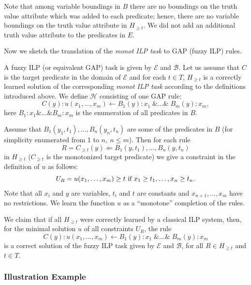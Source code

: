 Note that among variable boundings in $B$ there are no boundings on the truth value attribute which was added to each predicate; hence, there are no variable boundings on the truth value attribute in $H_{\ge t}$. We did not add an additional truth value attribute to the predicates in $E$. 

Now we sketch the translation of the \emph{monot ILP task} to GAP (fuzzy ILP) rules. 

\begin{theorem}
A fuzzy ILP (or equivalent GAP) task is given by ${\mathcal E}$ and ${\mathcal B}$. Let us assume that $C$ is the target predicate in the domain of ${\mathcal E}$ and for each $t \in T$, $H_{\ge t}$ is a correctly learned solution of the corresponding \textit{monot ILP task} according to the definitions introduced above. We define ${\mathcal H}$ consisting of one GAP rule:
$$C(y):u(x_1,\dots,x_m)\leftarrow B_1(y):x_1\; \&\dots\& \;B_m(y):x_m,$$
here $B_1:x_1 \&\dots\& B_m:x_m$ is the enumeration of all predicates in $B$.

Assume that $B_1(y_1,t_1),\dots,B_n(y_n,t_n)$ are some of the predicates in $B$ (for simplicity enumerated from 1 to $n, \ n \le m$). Then for each rule 
$$
R=C_{\ge t}(y)\Leftarrow B_1(y,t_1),\dots,B_n(y,t_n)
$$
in $H_{\ge t}$ ($C_{\ge t}$ is the monotonized target predicate) we give a constraint in the definition of $u$ as follows:
$$
U_R=u(x_1,\dots,x_m)\ge t \hbox{ if }x_1\ge t_1,\dots,x_n\ge t_n.
$$
Note that all $x_i$ and $y$ are variables, $t_i$ and $t$ are constants and $x_{n+1},\dots,x_m$ have no restrictions.
We learn the function $u$ as a ``monotone'' completion of the rules. 

We claim that if all $H_{\ge t}$ were correctly learned by a classical ILP system, then, for the minimal solution $u$ of all constraints $U_R$, the rule
$$
C(y):u(x_1,\dots,x_m)\leftarrow B_1(y):x_1\; \&\dots\& \;B_m(y):x_m
$$
is a correct solution of the fuzzy ILP task given by ${\mathcal E}$ and ${\mathcal B}$, for all $R\in H_{\ge t}$ and $t\in T$. 
\end{theorem}



\subsubsection{Illustration Example}

